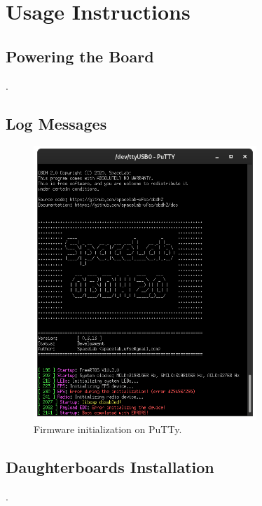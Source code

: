%
%
%
%
%

%
%
%
%
%
%

\chapter{Usage Instructions} \label{ch:instructions}

\section{Powering the Board}

.

\section{Log Messages}

\begin{figure}[!ht]
    \begin{center}
        \includegraphics[width=0.75\textwidth]{figures/putty-output.png}
        \caption{Firmware initialization on PuTTy.}
        \label{fig:putty-output}
    \end{center}
\end{figure}

\section{Daughterboards Installation}

.
